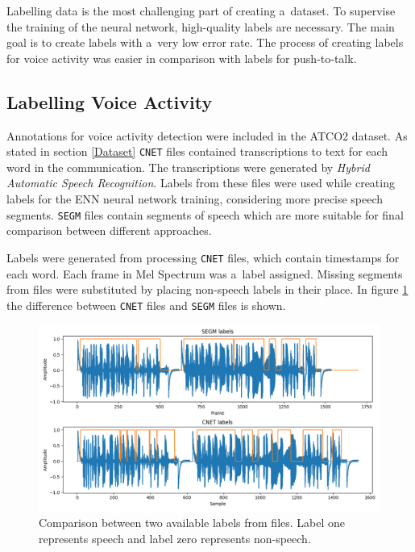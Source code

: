     Labelling data is the most challenging part of creating a~dataset. To supervise the training of the neural network, high-quality labels are necessary. The main goal is to create labels with a~very low error rate. The process of creating labels for voice activity was easier in comparison with labels for push-to-talk. 


    \subsection{Labelling Voice Activity}\label{LabelVAD}

        Annotations for voice activity detection were included in the ATCO2 dataset. As stated in section \ref{Dataset} \texttt{CNET} files contained transcriptions to text for each word in the communication. The transcriptions were generated by \textit{Hybrid Automatic Speech Recognition}. Labels from these files were used while creating labels for the ENN neural network training, considering more precise speech segments. \texttt{SEGM} files contain segments of speech which are more suitable for final comparison between different approaches.

        Labels were generated from processing \texttt{CNET} files, which contain timestamps for each word. Each frame in Mel Spectrum was a~label assigned. Missing segments from files were substituted by placing non-speech labels in their place. 
        \newpage
        In figure \ref{fig:CNETVSSEGM} the difference between \texttt{CNET} files and \texttt{SEGM} files is shown. 

        \begin{figure}[ht!]
            \centering
            \includegraphics[width = \textwidth]{obrazky-figures/cnetVSsegm.png}
            \caption{Comparison between two available labels from files. Label one represents speech and label zero represents non-speech.}
            \label{fig:CNETVSSEGM}
        \end{figure}

